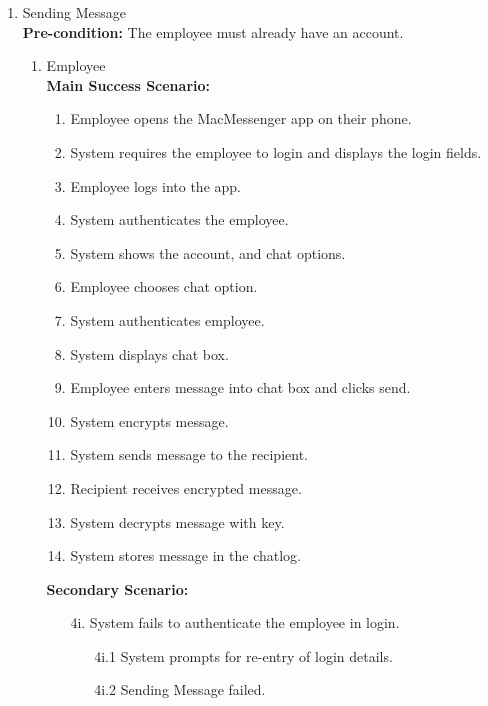 \documentclass[]{article}
\begin{document}
\begin{enumerate}[{\bf BE1.}]
	\item Sending Message\\
        \textbf{Pre-condition:} The employee must already have an account.
		\begin{enumerate}[{\bf VP1.}]
			\item Employee \\
				\textbf{Main Success Scenario:}
                \begin{enumerate}[{  1.}]
                    \item Employee opens the MacMessenger app on their phone.
                    \item System requires the employee to login and displays the login fields.
                    \item Employee logs into the app.
                    \item System authenticates the employee.
                    \item System shows the account, and chat options.
                    \item Employee chooses chat option. 
                    \item System authenticates employee.
                    \item System displays chat box.
                    \item Employee enters message into chat box and clicks send.
                    \item System encrypts message. 
                    \item System sends message to the recipient.
                    \item Recipient receives encrypted message. 
                    \item System decrypts message with key.
                    \item System stores message in the chatlog.
                \end{enumerate}
                \textbf{Secondary Scenario:}
                \begin{enumerate}
                    \item[4i.] System fails to authenticate the employee in login.
                    \begin{enumerate}
                        \item[4i.1] System prompts for re-entry of login details.
                        \item[4i.2] Sending Message failed.

\end{enumerate}
\end{enumerate}
\end{enumerate}
\end{enumerate}
\end{document}
